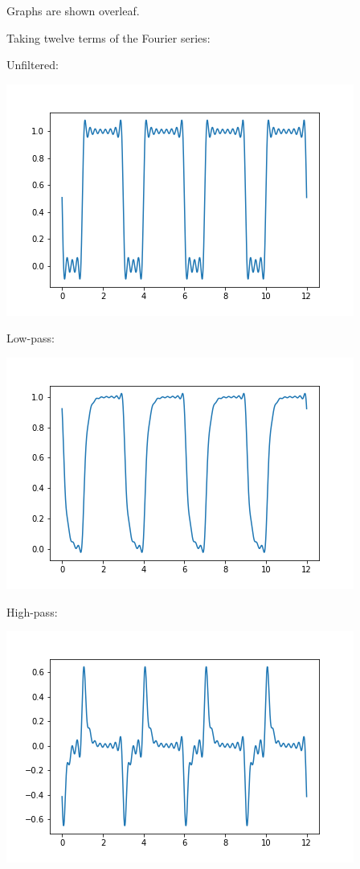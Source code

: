 \documentclass{article}
\begin{document}
Graphs are shown overleaf.



\clearpage


Taking twelve terms of the Fourier series:

Unfiltered:

\includegraphics[scale=0.7]{Unfiltered12.png}

Low-pass:

\includegraphics[scale=0.7]{LowPass12.png}

High-pass:

\includegraphics[scale=0.7]{HighPass12.png}
\end{document}
